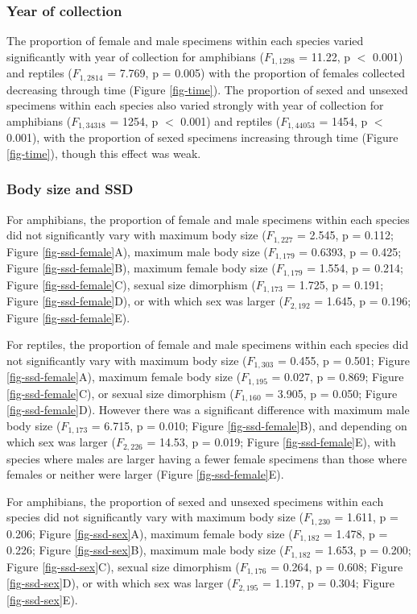 \documentclass[a4paper, 12pt]{article}
\begin{document}
\subsubsection{Year of collection}
The proportion of female and male specimens within each species varied significantly with year of collection for amphibians ($F_{1,1298}$ =  11.22, p $<$ 0.001) and reptiles ($F_{1,2814}$ = 7.769, p = 0.005) with the proportion of females collected decreasing through time (Figure \ref{fig-time}). 
The proportion of sexed and unsexed specimens within each species also varied strongly with year of collection for amphibians ($F_{1,34318}$ = 1254, p $<$ 0.001) and reptiles ($F_{1,44053}$ = 1454, p $<$ 0.001), with the proportion of sexed specimens increasing through time (Figure \ref{fig-time}), though this effect was weak.

\subsubsection{Body size and SSD}

For amphibians, the proportion of female and male specimens within each species did not significantly vary with maximum body size ($F_{1,227}$ =  2.545, p = 0.112; Figure \ref{fig-ssd-female}A), maximum male body size ($F_{1,179}$ =  0.6393, p = 0.425; Figure \ref{fig-ssd-female}B), maximum female body size ($F_{1,179}$ =  1.554, p = 0.214; Figure \ref{fig-ssd-female}C), sexual size dimorphism ($F_{1,173}$ =  1.725, p = 0.191; Figure \ref{fig-ssd-female}D), or with which sex was larger ($F_{2,192}$ =  1.645, p = 0.196; Figure \ref{fig-ssd-female}E).   

For reptiles, the proportion of female and male specimens within each species did not significantly vary with maximum body size ($F_{1,303}$ =  0.455, p = 0.501; Figure \ref{fig-ssd-female}A), maximum female body size  ($F_{1,195}$ =  0.027, p = 0.869; Figure \ref{fig-ssd-female}C), or sexual size dimorphism ($F_{1,160}$ =  3.905, p = 0.050; Figure \ref{fig-ssd-female}D). However there was a significant difference with maximum male body size  ($F_{1,173}$ =  6.715, p = 0.010; Figure \ref{fig-ssd-female}B), and depending on which sex was larger ($F_{2,226}$ =  14.53, p = 0.019; Figure \ref{fig-ssd-female}E), with species where males are larger having a fewer female specimens than those where females or neither were larger (Figure \ref{fig-ssd-female}E).

For amphibians, the proportion of sexed and unsexed specimens within each species did not significantly vary with maximum body size ($F_{1,230}$ =  1.611, p = 0.206; Figure \ref{fig-ssd-sex}A), maximum female body size ($F_{1,182}$ =  1.478, p = 0.226; Figure \ref{fig-ssd-sex}B), maximum male body size ($F_{1,182}$ =  1.653, p = 0.200; Figure \ref{fig-ssd-sex}C), sexual size dimorphism ($F_{1,176}$ =  0.264, p = 0.608; Figure \ref{fig-ssd-sex}D), or with which sex was larger ($F_{2,195}$ =  1.197, p = 0.304; Figure \ref{fig-ssd-sex}E).   
\end{document}

